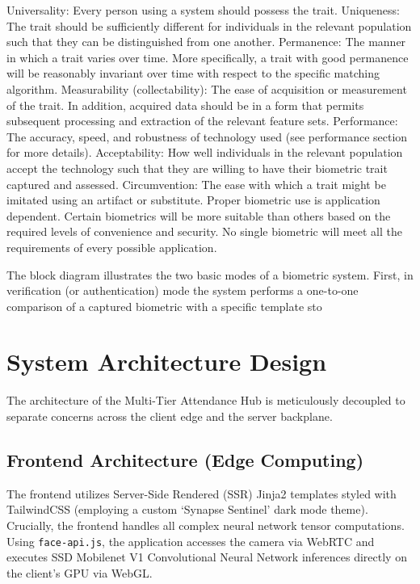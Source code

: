 \documentclass[12pt,a4paper]{report}
\begin{document}
Universality: Every person using a system should possess the trait.
Uniqueness: The trait should be sufficiently different for individuals in the relevant population such that they can be distinguished from one another.
Permanence: The manner in which a trait varies over time. More specifically, a trait with good permanence will be reasonably invariant over time with respect to the specific matching algorithm.
Measurability (collectability): The ease of acquisition or measurement of the trait. In addition, acquired data should be in a form that permits subsequent processing and extraction of the relevant feature sets.
Performance: The accuracy, speed, and robustness of technology used (see performance section for more details).
Acceptability: How well individuals in the relevant population accept the technology such that they are willing to have their biometric trait captured and assessed.
Circumvention: The ease with which a trait might be imitated using an artifact or substitute.
Proper biometric use is application dependent. Certain biometrics will be more suitable than others based on the required levels of convenience and security. No single biometric will meet all the requirements of every possible application.

The block diagram illustrates the two basic modes of a biometric system. First, in verification (or authentication) mode the system performs a one-to-one comparison of a captured biometric with a specific template sto



\section{System Architecture Design}
The architecture of the Multi-Tier Attendance Hub is meticulously decoupled to separate concerns across the client edge and the server backplane.

\subsection{Frontend Architecture (Edge Computing)}
The frontend utilizes Server-Side Rendered (SSR) Jinja2 templates styled with TailwindCSS (employing a custom `Synapse Sentinel' dark mode theme). Crucially, the frontend handles all complex neural network tensor computations. Using \texttt{face-api.js}, the application accesses the camera via WebRTC and executes SSD Mobilenet V1 Convolutional Neural Network inferences directly on the client's GPU via WebGL.
\end{document}
